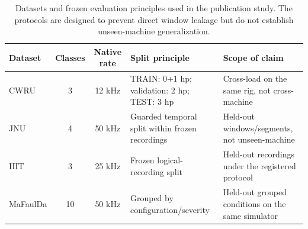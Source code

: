 \begin{table}[t]
\centering
\caption{Datasets and frozen evaluation principles used in the publication study. The protocols are designed to prevent direct window leakage but do not establish unseen-machine generalization.}
\label{tab:datasets}
\small
\begin{tabularx}{\textwidth}{l c c >{\raggedright\arraybackslash}X >{\raggedright\arraybackslash}X}
\toprule
Dataset & Classes & Native rate & Split principle & Scope of claim \\
\midrule
CWRU & 3 & 12 kHz & TRAIN: 0+1 hp; validation: 2 hp; TEST: 3 hp & Cross-load on the same rig, not cross-machine \\
JNU & 4 & 50 kHz & Guarded temporal split within frozen recordings & Held-out windows/segments, not unseen-machine \\
HIT & 3 & 25 kHz & Frozen logical-recording split & Held-out recordings under the registered protocol \\
MaFaulDa & 10 & 50 kHz & Grouped by configuration/severity & Held-out grouped conditions on the same simulator \\
\bottomrule
\end{tabularx}
\end{table}
